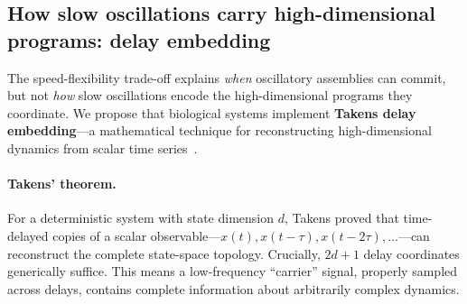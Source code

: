 %
%

\subsection{How slow oscillations carry high-dimensional programs: delay embedding}

\begin{center}
\end{center}

The speed-flexibility trade-off explains \emph{when} oscillatory assemblies can commit, but not \emph{how} slow oscillations encode the high-dimensional programs they coordinate. We propose that biological systems implement \textbf{Takens delay embedding}---a mathematical technique for reconstructing high-dimensional dynamics from scalar time series~\cite{takens1981}.

\paragraph{Takens' theorem.}
For a deterministic system with state dimension $d$, Takens proved that time-delayed copies of a scalar observable---$x(t), x(t-\tau), x(t-2\tau), \ldots$---can reconstruct the complete state-space topology. Crucially, $2d+1$ delay coordinates generically suffice. This means a low-frequency ``carrier'' signal, properly sampled across delays, contains complete information about arbitrarily complex dynamics.

